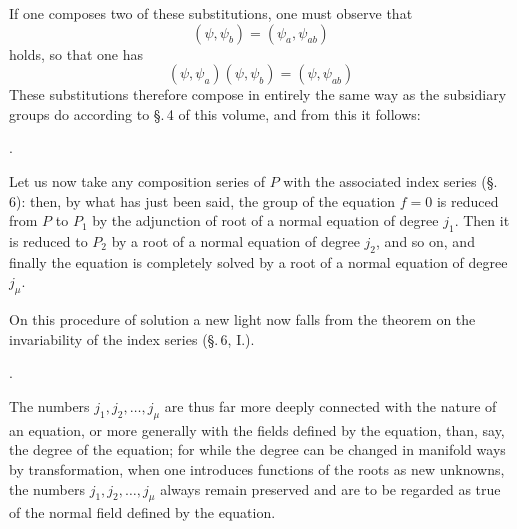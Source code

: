 
If one composes two of these substitutions, one must observe that
\[
(\psi, \psi_b) = (\psi_a, \psi_{ab})
\]
holds, so that one has
\[
(\psi, \psi_a)(\psi, \psi_b) = (\psi, \psi_{ab})
\]
These substitutions therefore compose in entirely the same way as the subsidiary groups do according to \S.\,4 of this volume, and from this it follows:

. 

Let us now take any composition series of $P$ with the associated
index series (\S.\,6):
then, by what has just been said, the group of the equation $f = 0$ is reduced from $P$ to $P_1$
by the adjunction of  root of a normal equation of degree $j_1$. Then
it is reduced to $P_2$ by a root of a normal equation of degree $j_2$,
and so on, and finally the equation is completely solved by a root
of a normal equation of degree $j_\mu$.

On this procedure of solution a new light now falls from the theorem on the
invariability of the index series (\S.\,6, I.).

. 

The numbers $j_1, j_2, \ldots, j_\mu$ are thus far more deeply connected with the nature of an
equation, or more generally with the fields defined by the equation,
than, say, the degree of the equation; for while the degree can be
changed in manifold ways by transformation, when one introduces functions of the roots as new
unknowns, the numbers $j_1, j_2, \ldots, j_\mu$ always remain preserved and
are to be regarded as true  of the normal field defined by
the equation.

